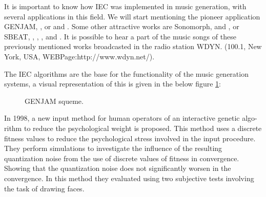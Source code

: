 It is important to know how IEC was implemented in music generation, with
several applications in this field. We will start mentioning the pioneer
application GENJAM, \cite{biles1994genjam},
\cite{biles1996neural} or \cite{biles1999life} and
\cite{biles2002genjam}. Some other attractive works are Sonomorph,
\cite{nelson1993sonomorphs} and \cite{nelson1995further}, or SBEAT, \cite{unemi2003sbeat3},
\cite{horowitz1994generating}, \cite{onisawa2000composition}, \cite{tokui2000music} and
\cite{fels2002interactive}. It is possible to hear a part of the
music songs of these previously mentioned works broadcasted in the radio station
WDYN. (100.1, New York, USA, WEBPage:http://www.wdyn.net/).

The IEC algorithms are the base for the functionality of the music generation
systems, a visual representation of this is given in the below figure \ref{fig:GENJAM}:

\begin{figure}
\captionsetup{justification=centering,margin=2cm}
\centering
\setlength\fboxsep{0pt}
\setlength\fboxrule{0.7pt}
\caption{GENJAM squeme.}
\label{fig:GENJAM}       
\end{figure}

In 1998, a new input method for human operators of an interactive genetic algo-
rithm to reduce the psychological weight is proposed. This method uses a
discrete fitness values to reduce the psychological stress involved in the input
procedure. They perform simulations to investigate the influence of the
resulting quantization noise from the use of discrete values of fitness in
convergence. Showing that the quantization noise does not significantly worsen
in the convergence. In this method they evaluated using two subjective tests
involving the task of drawing faces.

